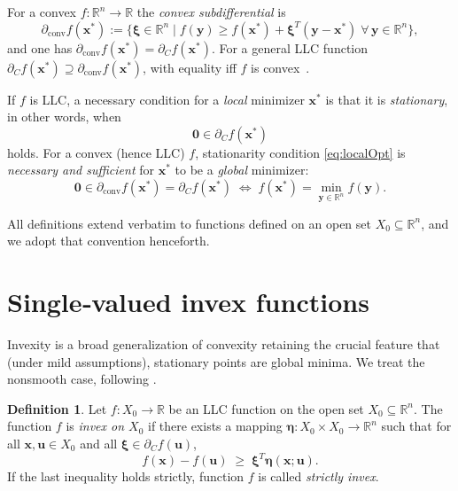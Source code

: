 \documentclass{article}
\theoremstyle{definition}
\newtheorem{maar}{Definition}[section]
\begin{document}
For a convex $f:\mathbb{R}^{n}\to\mathbb{R}$ the \emph{convex subdifferential} is  
\[
  \partial_{\mathrm{conv}}f(\boldsymbol x^{\ast})
  :=\bigl\{\boldsymbol\xi\in\mathbb{R}^{n}\mid
          f(\boldsymbol y)\ge f(\boldsymbol x^{\ast})
          +\boldsymbol\xi^{T}(\boldsymbol y-\boldsymbol x^{\ast})\;
          \forall\,\boldsymbol y\in\mathbb{R}^{n}\bigr\},
\]
and one has $\partial_{\mathrm{conv}}f(\boldsymbol x^{\ast})=\partial_{C}f(\boldsymbol x^{\ast})$.  
For a general LLC function $\partial_{C}f(\boldsymbol x^{\ast})\supseteq\partial_{\mathrm{conv}}f(\boldsymbol x^{\ast})$, with equality iff $f$ is convex~\cite{Cla}.

If $f$ is LLC, a necessary condition for a \emph{local} minimizer $\boldsymbol x^{\ast}$ is that it is {\sl stationary}, in other words, when 
\begin{equation}\label{eq:localOpt}
  \boldsymbol 0\in\partial_{C}f(\boldsymbol x^{\ast})
\end{equation}
holds.
For a convex (hence LLC) $f$, stationarity condition \eqref{eq:localOpt} is \emph{necessary and sufficient} for $\boldsymbol x^{\ast}$ to be a \emph{global} minimizer:
\begin{equation}\label{eq:convOpt}
  \boldsymbol 0\in\partial_{\mathrm{conv}}f(\boldsymbol x^{\ast})
  =\partial_{C}f(\boldsymbol x^{\ast})
  \;\Longleftrightarrow\;
  f(\boldsymbol x^{\ast})=\min_{\boldsymbol y\in\mathbb{R}^{n}}f(\boldsymbol y).
\end{equation}

All definitions extend verbatim to functions defined on an open set $X_{0}\subseteq\mathbb{R}^{n}$, and we adopt that convention henceforth.

\section{Single‑valued invex functions}

Invexity is a broad generalization of convexity retaining the crucial feature that (under mild assumptions), stationary points are global minima.  We treat the nonsmooth case, following \cite{Rei}.

\begin{maar}\cite{Rei}\label{def:Invex}
Let $f:X_{0}\to\mathbb{R}$ be an LLC function on the open set $X_{0}\subseteq\mathbb{R}^{n}$.  
The function $f$ is \emph{invex on $X_{0}$} if there exists a mapping
$\boldsymbol\eta:X_{0}\times X_{0}\to\mathbb{R}^{n}$ such that for all
$\boldsymbol x,\boldsymbol u\in X_{0}$ and all $\boldsymbol\xi\in\partial_{C}f(\boldsymbol u)$,
\[
  f(\boldsymbol x)-f(\boldsymbol u)\;\ge\;
  \boldsymbol\xi^T\boldsymbol\eta(\boldsymbol x;\boldsymbol u).
\] If the last inequality holds strictly, function $f$ is called \emph{strictly invex}.
\end{maar}
\end{document}
